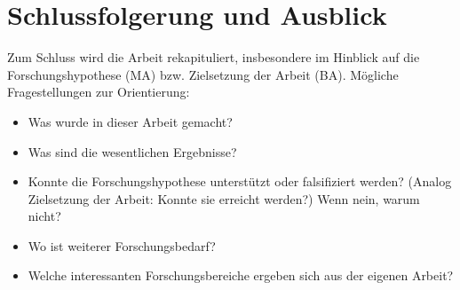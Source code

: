 \chapter{Schlussfolgerung und Ausblick}
\label{Conclusion}
Zum Schluss wird die Arbeit rekapituliert, insbesondere im Hinblick auf die Forschungshypothese (MA) bzw. Zielsetzung der Arbeit (BA).
Mögliche Fragestellungen zur Orientierung:
\begin{itemize}
	\item Was wurde in dieser Arbeit gemacht?
	\item Was sind die wesentlichen Ergebnisse?
	\item Konnte die Forschungshypothese unterstützt oder falsifiziert werden? (Analog Zielsetzung der Arbeit: Konnte sie erreicht werden?) Wenn nein, warum nicht?
	\item Wo ist weiterer Forschungsbedarf?
	\item Welche interessanten Forschungsbereiche ergeben sich aus der eigenen Arbeit?
\end{itemize}